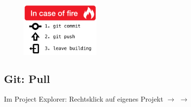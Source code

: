 \begin{figure}[h]
  \centering
   \includegraphics[width=0.35\textwidth]{./inf/SEKII/01_Vorbereitung/in-case-of-fire-1-git-commit-2-git-push-3-leave-building2.png}
\end{figure}

\subsection{Git: Pull}

Im Project Explorer: Rechtsklick auf eigenes Projekt $\rightarrow$ 
$\rightarrow$ 

\clearpage


% 
% 
% 

